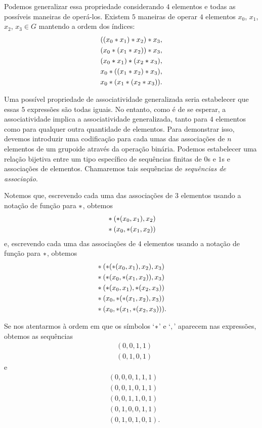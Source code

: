 Podemos generalizar essa propriedade considerando $4$ elementos e todas as possíveis maneiras de operá-los. Existem $5$ maneiras de operar $4$ elementos $x_0$, $x_1$, $x_2$, $x_3 \in G$ mantendo a ordem dos índices:
	\begin{align*}
	& ((x_0 \ast x_1) \ast x_2) \ast x_3, \\
	& (x_0 \ast (x_1 \ast x_2)) \ast x_3, \\
	& (x_0 \ast x_1) \ast (x_2 \ast x_3), \\
	& x_0 \ast ((x_1 \ast x_2) \ast x_3), \\
	& x_0 \ast (x_1 \ast (x_2 \ast x_3)).
	\end{align*}

Uma possível propriedade de associatividade generalizada seria estabelecer que essas $5$ expressões são todas iguais. No entanto, como é de se esperar, a associatividade implica a associatividade generalizada, tanto para $4$ elementos como para qualquer outra quantidade de elementos. Para demonstrar isso, devemos introduzir uma codificação para cada umas das associações de $n$ elementos de um grupoide através da operação binária. Podemos estabelecer uma relação bijetiva entre um tipo específico de sequências finitas de $0$s e $1$s e associações de elementos. Chamaremos tais sequências de \textit{sequências de associação}.

Notemos que, escrevendo cada uma das associações de $3$ elementos usando a notação de função para $\ast$, obtemos
	\begin{align*}
	& \ast(\ast(x_0,x_1),x_2) \\
	& \ast(x_0,\ast(x_1,x_2))
	\end{align*}
e, escrevendo cada uma das associações de $4$ elementos usando a notação de função para $\ast$, obtemos
	\begin{align*}
	& \ast(\ast(\ast(x_0,x_1),x_2),x_3) \\
	& \ast(\ast(x_0,\ast(x_1,x_2)),x_3) \\
	& \ast(\ast(x_0,x_1),\ast(x_2,x_3)) \\
	& \ast(x_0,\ast(\ast(x_1,x_2),x_3)) \\
	& \ast(x_0,\ast(x_1,\ast(x_2,x_3))).
	\end{align*}

Se nos atentarmos à ordem em que os símbolos `$\ast$' e `$,$' aparecem nas expressões, obtemos as sequências
	\begin{align*}
	& (0,0,1,1) \\
	& (0,1,0,1)
	\end{align*}
e
	\begin{align*}
	& (0,0,0,1,1,1) \\
	& (0,0,1,0,1,1) \\
	& (0,0,1,1,0,1) \\
	& (0,1,0,0,1,1) \\
	& (0,1,0,1,0,1).
	\end{align*}

